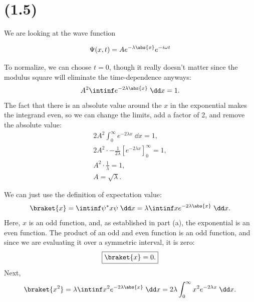 \section{(1.5)}

We are looking at the wave function

\begin{equation}
    \Psi(x,t) = Ae^{-\lambda\abs{x}}e^{-i\omega t}
\end{equation}

\begin{parts}
    \item To normalize, we can choose $t=0$, though it really doesn't matter since the modulus square will eliminate the time-dependence anyways:
        \begin{equation*}
            A^2 \intinf e^{-2\lambda\abs{x}} \;\dd x = 1.
        \end{equation*}
        The fact that there is an absolute value around the $x$ in the exponential makes the integrand even, so we can change the limits, add a factor of 2, and remove the absolute value:
        \begin{gather*}
            2A^2 \int_0^{\infty} e^{-2\lambda x} \;\dd x = 1, \\
            2A^2 \cdot -\frac{1}{2\lambda} \left[e^{-2\lambda x}\right]^{\infty}_0 = 1, \\
            A^2 \cdot \frac{1}{\lambda} = 1, \\
            \boxed{A = \sqrt{\lambda}.}
        \end{gather*}
    \item We can just use the definition of expectation value:
        \begin{equation*}
            \braket{x} = \intinf \psi^* x \psi \;\dd x = \lambda \intinf x e^{-2\lambda \abs{x}} \;\dd x.
        \end{equation*}
        Here, $x$ is an odd function, and, as established in part (a), the exponential is an even function. The product of an odd and even function is an odd function, and since we are evaluating it over a symmetric interval, it is zero:
        \begin{equation*}
            \boxed{\braket{x} = 0.}
        \end{equation*}
        Next,
        \begin{equation*}
            \braket{x^2} = \lambda \intinf x^2 e^{-2\lambda\abs{x}} \;\dd x = 2\lambda \int_{0}^{\infty} x^2 e^{-2\lambda x} \;\dd x.
        \end{equation*}

\end{parts}
